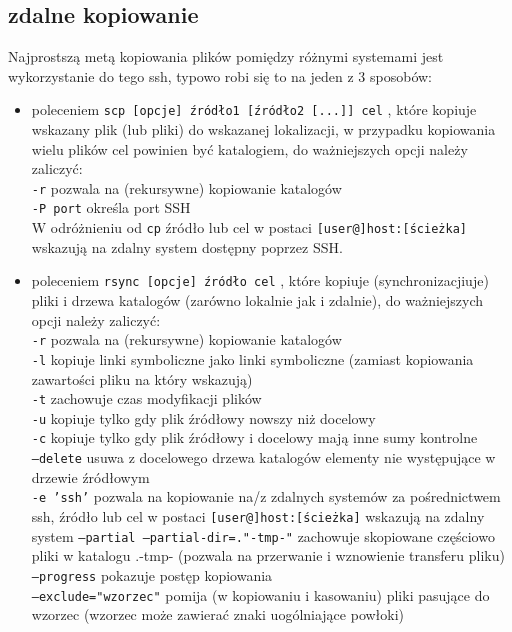 \subsection{zdalne kopiowanie}
Najprostszą metą kopiowania plików pomiędzy różnymi systemami jest wykorzystanie do tego ssh, typowo robi się to na jeden z 3 sposobów:
\begin{itemize}
	\item poleceniem
		\texttt{scp [opcje] źródło1 [źródło2 [...]] cel}
		, które
		kopiuje wskazany plik (lub pliki) do wskazanej lokalizacji, w przypadku kopiowania wielu plików cel powinien być katalogiem, do ważniejszych opcji należy zaliczyć:\\
		\texttt{-r} pozwala na (rekursywne) kopiowanie katalogów\\
		\texttt{-P port} określa port SSH\\
		W odróżnieniu od \texttt{cp} źródło lub cel w postaci \texttt{[user@]host:[ścieżka]} wskazują na zdalny system dostępny poprzez SSH.
	\item poleceniem
		\texttt{rsync [opcje] źródło cel}
		, które
		kopiuje (synchronizacjiuje) pliki i drzewa katalogów (zarówno lokalnie jak i zdalnie), do ważniejszych opcji należy zaliczyć:\\
			\texttt{-r} pozwala na (rekursywne) kopiowanie katalogów\\
			\texttt{-l} kopiuje linki symboliczne jako linki symboliczne (zamiast kopiowania zawartości pliku na który wskazują)\\
			\texttt{-t} zachowuje czas modyfikacji plików\\
			\texttt{-u} kopiuje tylko gdy plik źródłowy nowszy niż docelowy\\
			\texttt{-c} kopiuje tylko gdy plik źródłowy i docelowy mają inne sumy kontrolne\\
			\texttt{--delete} usuwa z docelowego drzewa katalogów elementy nie występujące w drzewie źródłowym\vspace{6pt}\\
			\texttt{-e 'ssh'} pozwala na kopiowanie na/z zdalnych systemów za pośrednictwem ssh, źródło lub cel w postaci \texttt{[user@]host:[ścieżka]} wskazują na zdalny system
			\texttt{--partial --partial-dir=."-tmp-"} zachowuje skopiowane częściowo pliki w katalogu .-tmp- (pozwala na przerwanie i wznowienie transferu pliku)\\
			\texttt{--progress} pokazuje postęp kopiowania\\
			\texttt{--exclude="wzorzec"} pomija (w kopiowaniu i kasowaniu) pliki pasujące do wzorzec (wzorzec może zawierać znaki uogólniające powłoki)

\end{itemize}
